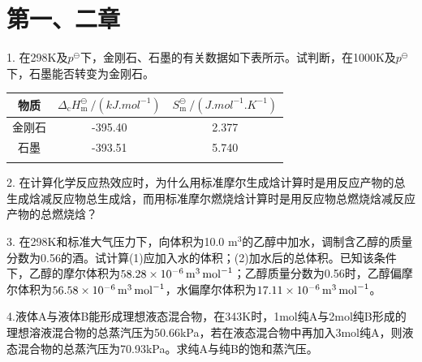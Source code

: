 \section{第一、二章}
1. 在298K及$p^\ominus$下，金刚石、石墨的有关数据如下表所示。试判断，在1000K及$p^\ominus$下，石墨能否转变为金刚石。
\begin{table}[h]
    \centering
    \begin{tabular}{ccc}
        \Xhline{1pt}
        物质 & $\Delta_\mathrm{c}H_\mathrm{m}^\ominus ~/(\si{kJ.mol^{-1}})$ & $S_\mathrm{m}^\ominus ~/(\si{J.mol^{-1}.K^{-1}})$ \\
        \hline
        金刚石 & -395.40 & 2.377 \\
        石墨 & -393.51 & 5.740 \\
        \Xhline{1pt} 
    \end{tabular}
\end{table}

2. 在计算化学反应热效应时，为什么用标准摩尔生成焓计算时是用反应产物的总生成焓减反应物总生成焓，而用标准摩尔燃烧焓计算时是用反应物总燃烧焓减反应产物的总燃烧焓？
\bigskip

3. 在298K和标准大气压力下，向体积为10.0 m$^3$的乙醇中加水，调制含乙醇的质量分数为0.56的酒。试计算(1)应加入水的体积；(2)加水后的总体积。已知该条件下，乙醇的摩尔体积为$\SI{58.28e{-6}}{m^3.mol^{-1}}$；乙醇质量分数为0.56时，乙醇偏摩尔体积为$\SI{56.58e{-6}}{m^3.mol^{-1}}$，水偏摩尔体积为$\SI{17.11e{-6}}{m^3.mol^{-1}}$。
\bigskip

4.液体A与液体B能形成理想液态混合物，在343K时，1mol纯A与2mol纯B形成的理想溶液混合物的总蒸汽压为50.66kPa，若在液态混合物中再加入3mol纯A，则液态混合物的总蒸汽压为70.93kPa。求纯A与纯B的饱和蒸汽压。
